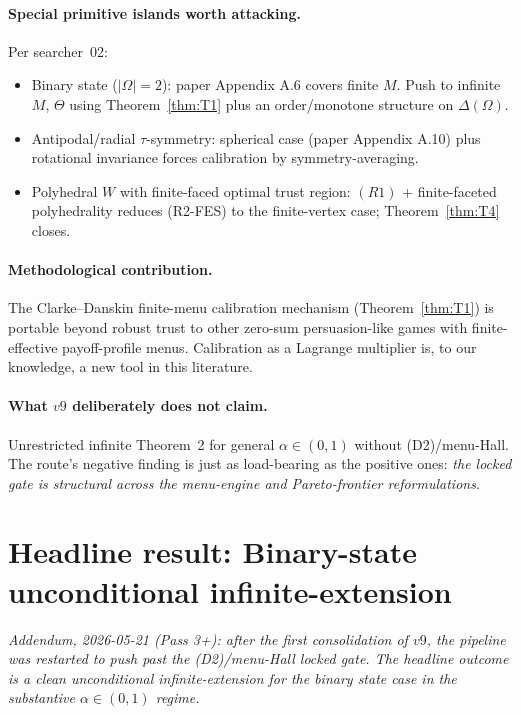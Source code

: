\documentclass[11pt]{article}
\theoremstyle{definition}
\theoremstyle{remark}
\newcommand{\Om}{\Omega}
\newcommand{\Th}{\Theta}
\begin{document}
\paragraph{Special primitive islands worth attacking.} Per searcher~02:
\begin{itemize}[leftmargin=*]
  \item Binary state ($|\Om|=2$): paper Appendix A.6 covers finite $M$.
    Push to infinite $M$, $\Th$ using Theorem~\ref{thm:T1} plus an
    order/monotone structure on $\Delta(\Om)$.
  \item Antipodal/radial $\tau$-symmetry: spherical case (paper
    Appendix A.10) plus rotational invariance forces calibration by
    symmetry-averaging.
  \item Polyhedral $W$ with finite-faced optimal trust region: $(R1)$
    + finite-faceted polyhedrality reduces (R2-FES) to the
    finite-vertex case; Theorem~\ref{thm:T4} closes.
\end{itemize}

\paragraph{Methodological contribution.} The Clarke--Danskin
finite-menu calibration mechanism (Theorem~\ref{thm:T1}) is portable
beyond robust trust to other zero-sum persuasion-like games with
finite-effective payoff-profile menus. Calibration as a Lagrange
multiplier is, to our knowledge, a new tool in this literature.

\paragraph{What $v9$ deliberately does not claim.} Unrestricted
infinite Theorem~2 for general $\alpha\in(0,1)$ without (D2)/menu-Hall.
The route's negative finding is just as load-bearing as the positive
ones: \emph{the locked gate is structural across the menu-engine and
Pareto-frontier reformulations}.

\section{Headline result: Binary-state unconditional infinite-extension}\label{sec:binary}

\emph{Addendum, 2026-05-21 (Pass 3+): after the first consolidation of
$v9$, the pipeline was restarted to push past the (D2)/menu-Hall
locked gate. The headline outcome is a clean unconditional
infinite-extension for the binary state case in the substantive
$\alpha\in(0,1)$ regime.}
\end{document}
